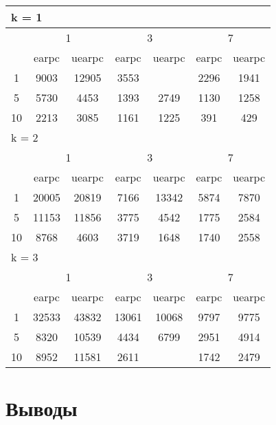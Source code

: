 \begin{table}
\begin{tabular}{|*7{c|}}
\hline
\multicolumn{7}{|l|}{k = 1} \\
\hline
\multirow{2}{*}{\diagbox{$\mu$}{$\lambda$}} & \multicolumn{2}{c|}{1} & \multicolumn{2}{c|}{3} & \multicolumn{2}{c|}{7} \\
\cline{2-7}
 & earpc & uearpc & earpc & uearpc & earpc & uearpc \\
\hline
1 & 9003 & 12905 & 3553& \cellcolor{olive}{1701} & 2296 & 1941 \\
\hline
5 & 5730 & 4453 & 1393 & 2749 & 1130 & 1258 \\
\hline
10 & 2213 & 3085 & 1161 & 1225 & 391 & 429 \\
\hline
\multicolumn{7}{|l|}{k = 2} \\
\hline
\multirow{2}{*}{\diagbox{$\mu$}{$\lambda$}} & \multicolumn{2}{c|}{1} & \multicolumn{2}{c|}{3} & \multicolumn{2}{c|}{7} \\
\cline{2-7}
 & earpc & uearpc & earpc & uearpc & earpc & uearpc \\
\hline
1 & 20005 & 20819 & 7166 & 13342 & 5874 & 7870 \\
\hline
5 & 11153 & 11856 & 3775 & 4542 & 1775 & 2584 \\
\hline
10 & 8768 & 4603 & 3719 & 1648 & 1740 & 2558 \\
\hline
\multicolumn{7}{|l|}{k = 3} \\
\hline
\multirow{2}{*}{\diagbox{$\mu$}{$\lambda$}} & \multicolumn{2}{c|}{1} & \multicolumn{2}{c|}{3} & \multicolumn{2}{c|}{7} \\
\cline{2-7}
 & earpc & uearpc & earpc & uearpc & earpc & uearpc \\
\hline
1 & 32533 & 43832 & 13061 & 10068 & 9797 & 9775 \\
\hline
5 & 8320 & 10539 & 4434 & 6799 & 2951 & 4914 \\
\hline
10 & 8952 & 11581 & 2611& \cellcolor{olive}{1307} & 1742 & 2479 \\
\hline
\end{tabular}
\end{table}


\section{Выводы}
